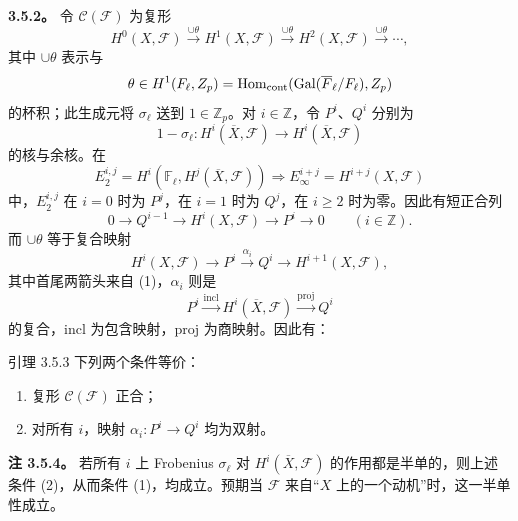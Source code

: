 \textbf{3.5.2。} 令 $\mathcal C(\mathcal F)$ 为复形
\[
 H^0(X,\mathcal F)\xrightarrow{\cup\theta}H^1(X,\mathcal F)\xrightarrow{\cup\theta}H^2(X,\mathcal F)\xrightarrow{\cup\theta}\cdots,
\]
其中 $\cup\theta$ 表示与
\[
 \theta\in H^1(F_\ell,Z_p)=\operatorname{Hom}_{\mathrm{cont}}(\operatorname{Gal}(\overline{F}_\ell/F_\ell),Z_p)
\]
的杯积；此生成元将 $\sigma_\ell$ 送到 $1\in\mathbb Z_p$。对 $i\in\mathbb Z$，令 $P^i$、$Q^i$ 分别为
\[
 1-\sigma_\ell:H^i(\overline X,\mathcal F)\longrightarrow H^i(\overline X,\mathcal F)
\]
的核与余核。在
\[
 E_2^{i,j}=H^i(\mathbb F_\ell,H^j(\overline X,\mathcal F))\Longrightarrow E_\infty^{i+j}=H^{i+j}(X,\mathcal F)
\]
中，$E_2^{i,j}$ 在 $i=0$ 时为 $P^j$，在 $i=1$ 时为 $Q^j$，在 $i\ge2$ 时为零。因此有短正合列
\begin{equation*}
 0\longrightarrow Q^{i-1}\longrightarrow H^i(X,\mathcal F)\longrightarrow P^i\longrightarrow0
 \qquad(i\in\mathbb Z).\tag{1}
\end{equation*}
而 $\cup\theta$ 等于复合映射
\[
 H^i(X,\mathcal F)\longrightarrow P^i\xrightarrow{\alpha_i}Q^i\longrightarrow H^{i+1}(X,\mathcal F),
\]
其中首尾两箭头来自 (1)，$\alpha_i$ 则是
\[
 P^i\xrightarrow{\mathrm{incl}}H^i(\overline X,\mathcal F)\xrightarrow{\mathrm{proj}}Q^i
\]
的复合，$\mathrm{incl}$ 为包含映射，$\mathrm{proj}$ 为商映射。因此有：
\begin{statement}{引理 3.5.3}
下列两个条件等价：
\begin{enumerate}[label=(\arabic*)]
\item 复形 $\mathcal C(\mathcal F)$ 正合；
\item 对所有 $i$，映射 $\alpha_i:P^i\longrightarrow Q^i$ 均为双射。
\end{enumerate}
\end{statement}
\textbf{注 3.5.4。} 若所有 $i$ 上 Frobenius $\sigma_\ell$ 对 $H^i(\overline X,\mathcal F)$ 的作用都是半单的，则上述条件 (2)，从而条件 (1)，均成立。预期当 $\mathcal F$ 来自“$X$ 上的一个动机”时，这一半单性成立。

